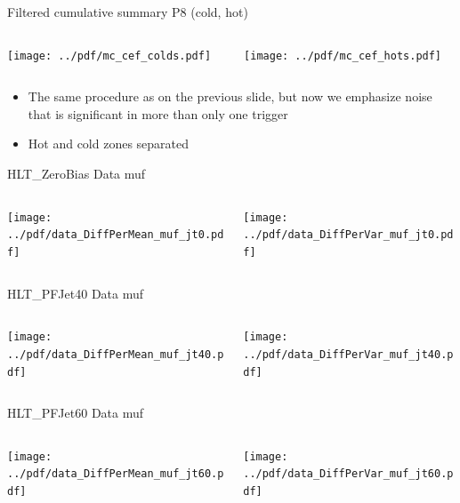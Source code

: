 \documentclass[9pt]{beamer}
\begin{document}
\begin{frame}[t]{Filtered cumulative summary P8 (cold, hot)}
\begin{columns}[T]
  \begin{column}{.5\textwidth}
  \texttt{[image: ../pdf/mc\_cef\_colds.pdf]}
  \end{column}
  \begin{column}{.5\textwidth}
  \texttt{[image: ../pdf/mc\_cef\_hots.pdf]}
  \end{column}
\end{columns}
\begin{itemize}
 \item The same procedure as on the previous slide, but now we emphasize noise that is significant in more than only one trigger
 \item Hot and cold zones separated
\end{itemize}
\end{frame}


\begin{frame}[t]{HLT\_ZeroBias Data muf}
\begin{columns}[T]
  \begin{column}{.5\textwidth}
  \texttt{[image: ../pdf/data\_DiffPerMean\_muf\_jt0.pdf]}
  \end{column}
  \begin{column}{.5\textwidth}
  \texttt{[image: ../pdf/data\_DiffPerVar\_muf\_jt0.pdf]}
  \end{column}
\end{columns}
\end{frame}

\begin{frame}[t]{HLT\_PFJet40 Data muf}
\begin{columns}[T]
  \begin{column}{.5\textwidth}
  \texttt{[image: ../pdf/data\_DiffPerMean\_muf\_jt40.pdf]}
  \end{column}
  \begin{column}{.5\textwidth}
  \texttt{[image: ../pdf/data\_DiffPerVar\_muf\_jt40.pdf]}
  \end{column}
\end{columns}
\end{frame}

\begin{frame}[t]{HLT\_PFJet60 Data muf}
\begin{columns}[T]
  \begin{column}{.5\textwidth}
  \texttt{[image: ../pdf/data\_DiffPerMean\_muf\_jt60.pdf]}
  \end{column}
  \begin{column}{.5\textwidth}
  \texttt{[image: ../pdf/data\_DiffPerVar\_muf\_jt60.pdf]}
  \end{column}
\end{columns}
\end{frame}
\end{document}
